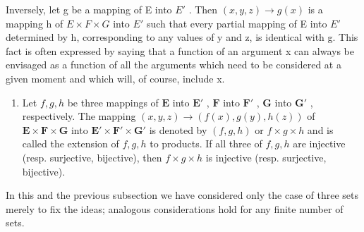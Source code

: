 Inversely, let g be a mapping of E into \(E'\) . Then \((x, y, z) \to g(x)\) is a mapping h of \(E \times F \times G\) into \(E'\) such that every partial mapping of E into \(E'\) determined by h, corresponding to any values of y and z, is identical with g. This fact is often expressed by saying that a function of an argument x can always be envisaged as a function of all the arguments which need to be considered at a given moment and which will, of course, include x.

\begin{enumerate}
\def\labelenumi{\arabic{enumi}.}
\setcounter{enumi}{13}
\tightlist
\item
  Let \(f, g, h\) be three mappings of \(\mathbf{E}\) into \(\mathbf{E}'\) , \(\mathbf{F}\) into \(\mathbf{F}'\) , \(\mathbf{G}\) into \(\mathbf{G}'\) , respectively. The mapping \((x, y, z) \to (f(x), g(y), h(z))\) of \(\mathbf{E} \times \mathbf{F} \times \mathbf{G}\) into \(\mathbf{E}' \times \mathbf{F}' \times \mathbf{G}'\) is denoted by \((f, g, h)\) or \(f \times g \times h\) and is called the extension of \(f, g, h\) to products. If all three of \(f, g, h\) are injective (resp. surjective, bijective), then \(f \times g \times h\) is injective (resp. surjective, bijective).
\end{enumerate}

In this and the previous subsection we have considered only the case of three sets merely to fix the ideas; analogous considerations hold for any finite number of sets.


